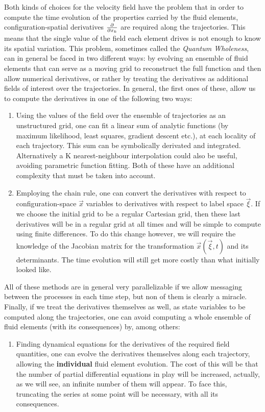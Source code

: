 \documentclass[11pt, a4paper]{article} %
\begin{document}
\begin{enumerate}
Both kinds of choices for the velocity field have the problem that in order to compute the time evolution of the properties carried by the fluid elements, configuration-spatial derivatives $\pdv{}{x_k}$ are required along the trajectories. This means that the single value of the field each element drives is not enough to know its spatial variation. This problem, sometimes called the {\em Quantum Wholeness}, can in general be faced in two different ways: by evolving an ensemble of fluid elements that can serve as a moving grid to reconstruct the full function and then allow numerical derivatives, or rather by treating the derivatives as additional fields of interest over the trajectories. In general, the first ones of these, allow us to compute the derivatives in one of the following two ways:

\begin{enumerate}
\item Using the values of the field over the ensemble of trajectories as an unstructured grid, one can fit a linear sum of analytic functions (by maximum likelihood, least squares, gradient descent etc.), at each locality of each trajectory. This sum can be symbolically derivated and integrated. Alternatively a K nearest-neighbour interpolation could also be useful, avoiding parametric function fitting. Both of these have an additional complexity that must be taken into account.

\item Employing the chain rule, one can convert the derivatives with respect to configuration-space $\vec{x}$ variables to derivatives with respect to label space $\vec{\xi}$. If we choose the initial grid to be a regular Cartesian grid, then these last derivatives will be in a regular grid at all times and will be simple to compute using finite differences. To do this change however, we will require the knowledge of the Jacobian matrix for the transformation $\vec{x}(\vec{\xi},t)$ and its determinants. The time evolution will still get more costly than what initially looked like.

\end{enumerate}
All of these methods are in general very parallelizable if we allow messaging between the processes in each time step, but non of them is clearly a miracle. Finally, if we treat the derivatives themselves as well, as state variables to be computed along the trajectories, one can avoid computing a whole ensemble of fluid elements (with its consequences) by, among others:
\begin{enumerate}
\item Finding dynamical equations for the derivatives of the required field quantities, one can evolve the derivatives themselves along each trajectory, allowing the {\bf individual} fluid element evolution. The cost of this will be that the number of partial differential equations in play will be increased, actually, as we will see, an infinite number of them will appear. To face this, truncating the series at some point will be necessary, with all its consequences.


\end{enumerate}
\end{enumerate}
\end{document}
